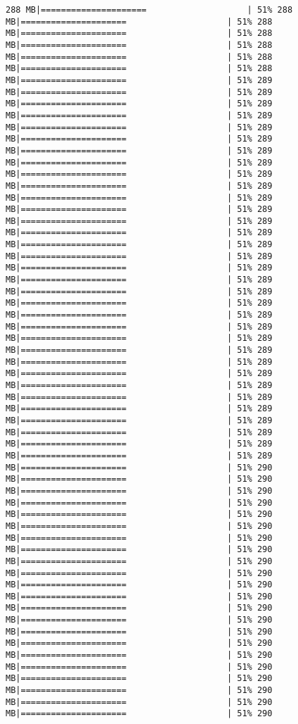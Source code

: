 \documentclass[
]{article}
\begin{document}
\begin{verbatim}
288 MB|=====================                    | 51% 288 MB|=====================                    | 51% 288 MB|=====================                    | 51% 288 MB|=====================                    | 51% 288 MB|=====================                    | 51% 288 MB|=====================                    | 51% 288 MB|=====================                    | 51% 289 MB|=====================                    | 51% 289 MB|=====================                    | 51% 289 MB|=====================                    | 51% 289 MB|=====================                    | 51% 289 MB|=====================                    | 51% 289 MB|=====================                    | 51% 289 MB|=====================                    | 51% 289 MB|=====================                    | 51% 289 MB|=====================                    | 51% 289 MB|=====================                    | 51% 289 MB|=====================                    | 51% 289 MB|=====================                    | 51% 289 MB|=====================                    | 51% 289 MB|=====================                    | 51% 289 MB|=====================                    | 51% 289 MB|=====================                    | 51% 289 MB|=====================                    | 51% 289 MB|=====================                    | 51% 289 MB|=====================                    | 51% 289 MB|=====================                    | 51% 289 MB|=====================                    | 51% 289 MB|=====================                    | 51% 289 MB|=====================                    | 51% 289 MB|=====================                    | 51% 289 MB|=====================                    | 51% 289 MB|=====================                    | 51% 289 MB|=====================                    | 51% 289 MB|=====================                    | 51% 289 MB|=====================                    | 51% 289 MB|=====================                    | 51% 289 MB|=====================                    | 51% 289 MB|=====================                    | 51% 289 MB|=====================                    | 51% 290 MB|=====================                    | 51% 290 MB|=====================                    | 51% 290 MB|=====================                    | 51% 290 MB|=====================                    | 51% 290 MB|=====================                    | 51% 290 MB|=====================                    | 51% 290 MB|=====================                    | 51% 290 MB|=====================                    | 51% 290 MB|=====================                    | 51% 290 MB|=====================                    | 51% 290 MB|=====================                    | 51% 290 MB|=====================                    | 51% 290 MB|=====================                    | 51% 290 MB|=====================                    | 51% 290 MB|=====================                    | 51% 290 MB|=====================                    | 51% 290 MB|=====================                    | 51% 290 MB|=====================                    | 51% 290 MB|=====================                    | 51% 290 MB|=====================                    | 51% 290 MB|=====================                    | 51% 290 
\end{verbatim}
\end{document}
